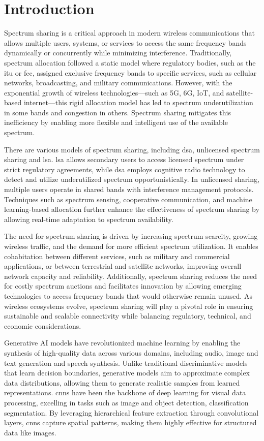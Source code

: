 \chapter{Introduction}
\label{chap:introduction}

Spectrum sharing is a critical approach in modern wireless communications that allows multiple users, systems, or services to access the same frequency bands dynamically or concurrently while minimizing interference. Traditionally, spectrum allocation followed a static model where regulatory bodies, such as the  \gls{itu} or \gls{fcc}, assigned exclusive frequency bands to specific services, such as cellular networks, broadcasting, and military communications. However, with the exponential growth of wireless technologies—such as 5G, 6G, IoT, and satellite-based internet—this rigid allocation model has led to spectrum underutilization in some bands and congestion in others. Spectrum sharing mitigates this inefficiency by enabling more flexible and intelligent use of the available spectrum. 

There are various models of spectrum sharing, including \gls{dsa}, unlicensed spectrum sharing and \gls{lsa}. \gls{lsa} allows secondary users to access licensed spectrum under strict regulatory agreements, while \gls{dsa} employs cognitive radio technology to detect and utilize underutilized spectrum opportunistically. In unlicensed sharing, multiple users operate in shared bands  with interference management protocols. Techniques such as spectrum sensing, cooperative communication, and machine learning-based allocation further enhance the effectiveness of spectrum sharing by allowing real-time adaptation to spectrum availability. 

The need for spectrum sharing is driven by increasing spectrum scarcity, growing wireless traffic, and the demand for more efficient spectrum utilization. It enables cohabitation between different services, such as military and commercial applications, or between terrestrial and satellite networks, improving overall network capacity and reliability. Additionally, spectrum sharing reduces the need for costly spectrum auctions and facilitates innovation by allowing emerging technologies to access frequency bands that would otherwise remain unused. As wireless ecosystems evolve, spectrum sharing will play a pivotal role in ensuring sustainable and scalable connectivity while balancing regulatory, technical, and economic considerations.

Generative AI models have revolutionized machine learning by enabling the synthesis of high-quality data across various domains, including audio, image and text generation and speech synthesis. Unlike traditional discriminative models that learn decision boundaries, generative models aim to approximate complex data distributions, allowing them to generate realistic samples from learned representations. \gls{cnn}s have been the backbone of deep learning for visual data processing, excelling in tasks such as image and object detection, classification segmentation. By leveraging hierarchical feature extraction through convolutional layers, \gls{cnn}s capture spatial patterns, making them highly effective for structured data like images.



